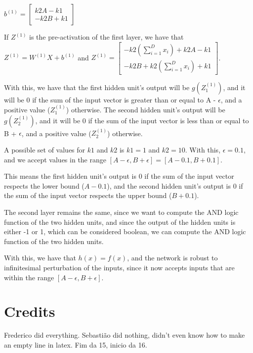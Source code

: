 \documentclass{article}
\begin{document}
\bigskip

\(b^{(1)} = \begin{bmatrix}
    k2A - k1 \\
    -k2B + k1
\end{bmatrix}
\)

\bigskip

If $Z^{(1)}$ is the pre-activation of the first layer, we have that $Z^{(1)} = W^{(1)}X + b^{(1)}$ and
$Z^{(1)} = \begin{bmatrix}
    -k2(\sum_{i=1}^{D} x_i) + k2A - k1\\
    -k2B + k2(\sum_{i=1}^{D} x_i) + k1
\end{bmatrix}
$.

\bigskip

With this, we have that the first hidden unit's output will be $g(Z^{(1)}_1)$, and it will be 0 if the sum of the 
input vector is greater than or equal to A - $\epsilon$, and a positive value ($Z^{(1)}_1$) otherwise. 
The second hidden unit's output will be $g(Z^{(1)}_2)$, and it will be 0 if the sum of the input vector is less than or equal 
to B + $\epsilon$, and a positive value ($Z^{(1)}_2$) otherwise.

A possible set of values for $k1$ and $k2$ is $k1 = 1$ and $k2 = 10$. With this, $\epsilon = 0.1$, and we accept values in
the range $[A - \epsilon, B + \epsilon] = [A - 0.1, B + 0.1]$.

This means the first hidden unit's output is 0 if the sum of the input vector respects the lower bound ($A - 0.1$),
and the second hidden unit's output is 0 if the sum of the input vector respects the upper bound ($B + 0.1$).

\bigskip

The second layer remains the same, since we want to compute the AND logic function of the two hidden units, and since the output of
the hidden units is either -1 or 1, which can be considered boolean, we can compute the AND logic function of the two hidden units.

With this, we have that \(h(x) = f(x)\), and the network is robust to infinitesimal perturbation of the inputs, since it now accepts inputs
that are within the range \([A - \epsilon, B + \epsilon]\).

\section{Credits}

Frederico did everything.
Sebastião did nothing, didn't even know how to make an empty line in latex.
Fim da 15, inicio da 16.
\end{document}

